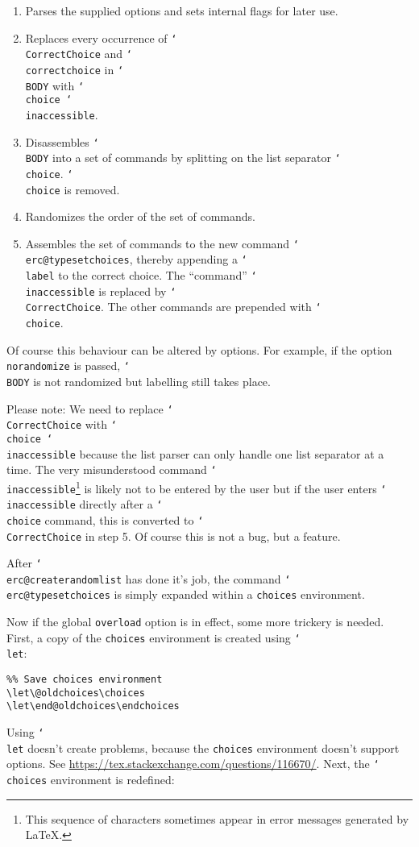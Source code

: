 \documentclass[12pt,a4paper]{exam}
\providecommand{\texorpdfstring}[2]{#1}
\newcommand{\bs}{\texorpdfstring{\char`\\}{}}
\begin{document}
\begin{enumerate}
\item Parses the supplied options and sets internal flags for later use.
\item Replaces every occurrence of \texttt{\bs CorrectChoice} and
      \texttt{\bs correctchoice} in \texttt{\bs BODY} 
      with \texttt{\bs choice \bs inaccessible}.
\item Disassembles \texttt{\bs BODY} into a set of commands by splitting on the list
      separator \texttt{\bs choice}. \texttt{\bs choice} is removed.
\item Randomizes the order of the set of commands.
\item Assembles the set of commands to the new command \texttt{\bs erc@typesetchoices},
      thereby appending a \texttt{\bs label} to the correct choice. The ``command''
      \texttt{\bs inaccessible} is replaced by \texttt{\bs CorrectChoice}. The
      other commands are prepended with \texttt{\bs choice}.
\end{enumerate}

Of course this behaviour can be altered by options. For example, if the option
\texttt{norandomize} is passed, \texttt{\bs BODY} is not randomized but labelling still
takes place.

Please note: We need to replace \texttt{\bs CorrectChoice} with \texttt{\bs choice \bs inaccessible}
because the list parser can only handle one list separator at a time. The very misunderstood command
\texttt{\bs inaccessible}\footnote{This sequence of characters sometimes appear in error messages
generated by \LaTeX.} is likely not to be entered by the user but if the user enters \texttt{\bs inaccessible}
directly after a \texttt{\bs choice} command, this is converted to \texttt{\bs CorrectChoice}
in step 5. Of course this is not a bug, but a feature.

After \texttt{\bs erc@createrandomlist} has done it's job, the command \texttt{\bs erc@typesetchoices}
is simply expanded within a \texttt{choices} environment.

Now if the global \texttt{overload} option is in effect, some more trickery is needed. First, a copy
of the \texttt{choices} environment is created using \texttt{\bs let}:

\begin{lstlisting}
%% Save choices environment
\let\@oldchoices\choices
\let\end@oldchoices\endchoices
\end{lstlisting}

Using \texttt{\bs let} doesn't create problems, because the \texttt{choices} environment
doesn't support options. See \url{https://tex.stackexchange.com/questions/116670/}.
Next, the \texttt{\bs choices} environment is redefined:
\end{document}
